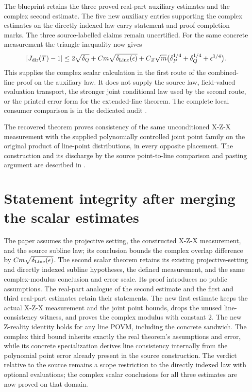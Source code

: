 \documentclass[11pt]{article}
\begin{document}
The blueprint retains the three proved real-part auxiliary estimates and
the complex second estimate. The five new auxiliary entries supporting the
complex estimates on the directly indexed law carry statement and proof
completion marks. The three source-labelled claims remain uncertified.
For the same concrete measurement the triangle inequality now gives
\[
 |J_{\rm dir}(T)-1|\leq 2\sqrt{\delta_Q}
 +Cm\sqrt{\delta_{\mathrm{Line}}(\epsilon)}
 +C_Z\sqrt m\bigl(\delta_P^{1/4}+\delta_Q^{1/4}+\epsilon^{1/4}\bigr).
\]
This supplies the complex scalar calculation in the first route of the
combined-line proof on the auxiliary law. It does not supply the source law,
field-valued evaluation transport, the stronger joint conditional law used by
the second route, or the printed error form for the extended-line theorem.
The complete local consumer comparison is in the dedicated audit
.

The recovered theorem 
proves consistency of the same unconditioned X-Z-X measurement
with the supplied polynomially controlled joint point family on the
original product of line-point distributions, in every opposite placement.
The construction and its discharge by the source point-to-line comparison and
pasting argument are described in
.

\section{Statement integrity after merging the scalar estimates}

The paper assumes the projective setting, the constructed X-Z-X measurement,
and the source subline law; its conclusion bounds the complex overlap
difference by $C m\sqrt{\delta_{\mathrm{Line}}(\epsilon)}$.
The second scalar theorem retains its existing projective-setting and
directly indexed subline hypotheses,
the defined measurement, and the same complex-modulus conclusion and error
scale. Its proof introduces no public assumptions. The real-part analogue
of the second estimate and the first and third real-part estimates retain
their statements. The new first estimate keeps the actual X-Z-X measurement
and the joint point bounds, drops the unused line-consistency witness, and
proves the complex modulus with constant $2$. The new Z-reality identity holds
for any line POVM, including the concrete sandwich. The complex third bound
inherits exactly the real theorem's assumptions and error, while its concrete
specialization derives line consistency internally from the polynomial point
error already present in the source construction.
The verdict relative to the source remains a scope restriction to the
directly indexed law with optional evaluations; the complex scalar
conclusions for all three estimates are now proved on that domain.
\end{document}
